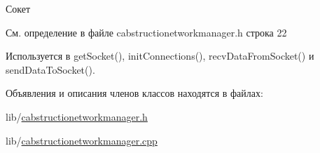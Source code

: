 Сокет 



См. определение в файле cabstructionetworkmanager.\+h строка 22



Используется в get\+Socket(), init\+Connections(), recv\+Data\+From\+Socket() и send\+Data\+To\+Socket().



Объявления и описания членов классов находятся в файлах\+:\begin{DoxyCompactItemize}
\item 
lib/\hyperlink{cabstructionetworkmanager_8h}{cabstructionetworkmanager.\+h}\item 
lib/\hyperlink{cabstructionetworkmanager_8cpp}{cabstructionetworkmanager.\+cpp}\end{DoxyCompactItemize}
